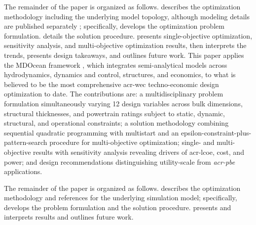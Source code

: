     The remainder of the paper is organized as follows.
     describes the optimization methodology including the underlying model topology, although modeling details are published separately \citep{mccabe_development_2026}; specifically,
     develops the optimization problem formulation.
     details the solution procedure.
     presents single-objective optimization, sensitivity analysis, and multi-objective optimization results,
    then interprets the trends, presents design takeaways, and outlines future work.
\else
    This paper applies the MDOcean framework \citep{mccabe_development_2026}, which integrates semi-analytical models across hydrodynamics, dynamics and control, structures, and economics, to what is believed to be the most comprehensive \gls{acr-wec} techno-economic design optimization to date.
    The contributions are: a multidisciplinary problem formulation simultaneously varying 12 design variables across bulk dimensions, structural thicknesses, and powertrain ratings subject to static, dynamic, structural, and operational constraints;
    a solution methodology combining sequential quadratic programming with multistart and an epsilon-constraint-plus-pattern-search procedure for multi-objective optimization;
    single- and multi-objective results with sensitivity analysis revealing drivers of \gls{acr-lcoe}, cost, and power; and design recommendations distinguishing utility-scale from \emph{\gls{acr-pbe}} applications.

    The remainder of the paper is organized as follows.
     describes the optimization methodology and references \citet{mccabe_development_2026} for the underlying simulation model; specifically,
     develops the problem formulation and  the solution procedure.
     presents and interprets results and outlines future work.
\fi
